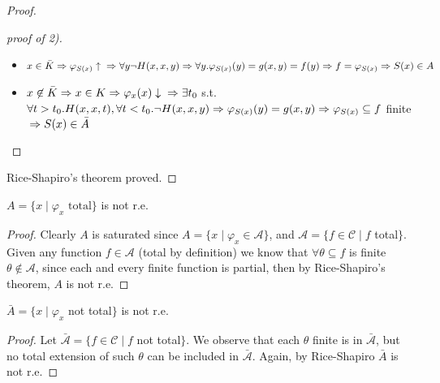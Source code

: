 \begin{theorem}
\begin{proof}
\begin{proof}[proof of 2)]
    \begin{itemize}
    \item $ x\in\bar{K}\\ \Rightarrow\varphi_{S(x)}\uparrow \\
      \Rightarrow\forall y\lnot H(x,x,y)\\ \Rightarrow \forall
      y.\varphi_{S(x)}(y) = g(x,y) = f(y)\\ \Rightarrow f = \varphi_{S(x)}\\
      \Rightarrow S(x)\in A$
    \item
      $ x\not\in\bar{K}\\ \Rightarrow x\in K\\ \Rightarrow
      \varphi_x(x)\downarrow\\ \Rightarrow \exists t_0 $ s.t.
      $ \forall
      t>t_0. H(x,x,t), \forall t<t_0. \lnot H(x,x,y)\\
      \Rightarrow\varphi_{S(x)}(y) = g(x,y)\\ \Rightarrow
      \varphi_{S(x)}\subseteq f$ finite
      $\\ \Rightarrow S(x) \in \bar{A} $
    \end{itemize}
  \end{proof}

  Rice-Shapiro's theorem proved.
\end{proof}
\end{theorem}

\begin{example}\label{exe:rice1}
  $A = \{ x \mid \varphi_x \mbox{ total}\}$ is not r.e.

  \begin{proof}
    Clearly $A$ is saturated since $A = \{x \mid \varphi_x \in
    \mathcal{A}\}$, and $\mathcal{A} = \{f \in \mathcal{C} \mid f $ total$\}$. 
    Given any function $f \in \mathcal{A}$ (total by
    definition) we know that $\forall \theta \subseteq f$
    is finite $\theta \notin \mathcal{A}$, since each and every finite
    function is partial, then by Rice-Shapiro's theorem, $A$ is
    not r.e.
  \end{proof}
\end{example}

\begin{example}\label{exe:rice2}
  $\bar{A} = \{x \mid \varphi_x $ not total$\}$ is not r.e.

  \begin{proof}
    Let $\bar{\mathcal{A}} = \{f \in \mathcal{C} \mid f $ not total$\}$. We observe that each $\theta$ finite is in
    $\bar{\mathcal{A}}$, but no total extension of such $\theta$ can
    be included in $\bar{\mathcal{A}}$. Again, by Rice-Shapiro
    $\bar{A}$ is not r.e.
  \end{proof}
\end{example}

